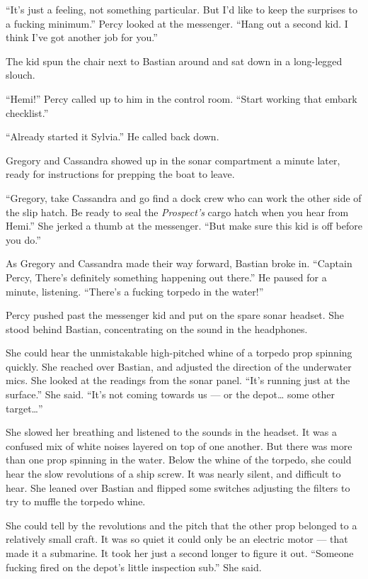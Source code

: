 \documentclass[
]{scrbook}
\begin{document}
``It's just a feeling, not something particular. But I'd like to keep
the surprises to a fucking minimum.'' Percy looked at the messenger.
``Hang out a second kid. I think I've got another job for you.''

The kid spun the chair next to Bastian around and sat down in a
long-legged slouch.

``Hemi!'' Percy called up to him in the control room. ``Start working
that embark checklist.''

``Already started it Sylvia.'' He called back down.

Gregory and Cassandra showed up in the sonar compartment a minute later,
ready for instructions for prepping the boat to leave.

``Gregory, take Cassandra and go find a dock crew who can work the other
side of the slip hatch. Be ready to seal the \emph{Prospect's} cargo
hatch when you hear from Hemi.'' She jerked a thumb at the messenger.
``But make sure this kid is off before you do.''

As Gregory and Cassandra made their way forward, Bastian broke in.
``Captain Percy, There's definitely something happening out there.'' He
paused for a minute, listening. ``There's a fucking torpedo in the
water!''

Percy pushed past the messenger kid and put on the spare sonar headset.
She stood behind Bastian, concentrating on the sound in the headphones.

She could hear the unmistakable high-pitched whine of a torpedo prop
spinning quickly. She reached over Bastian, and adjusted the direction
of the underwater mics. She looked at the readings from the sonar panel.
``It's running just at the surface.'' She said. ``It's not coming
towards us --- or the depot\ldots{} some other target\ldots{}''

She slowed her breathing and listened to the sounds in the headset. It
was a confused mix of white noises layered on top of one another. But
there was more than one prop spinning in the water. Below the whine of
the torpedo, she could hear the slow revolutions of a ship screw. It was
nearly silent, and difficult to hear. She leaned over Bastian and
flipped some switches adjusting the filters to try to muffle the torpedo
whine.

She could tell by the revolutions and the pitch that the other prop
belonged to a relatively small craft. It was so quiet it could only be
an electric motor --- that made it a submarine. It took her just a
second longer to figure it out. ``Someone fucking fired on the depot's
little inspection sub.'' She said.
\end{document}
